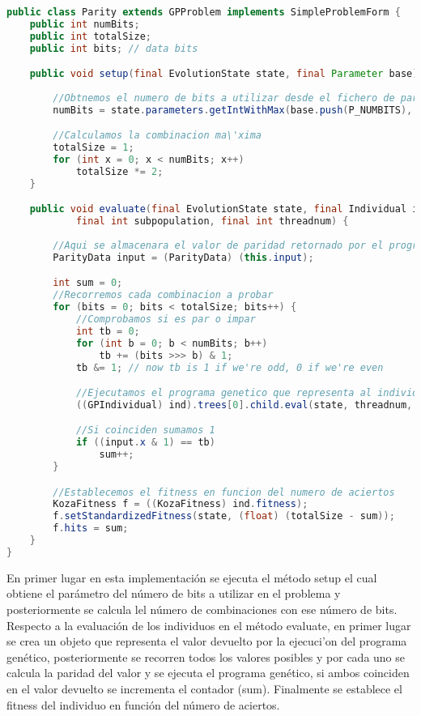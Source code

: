 \begin{lstlisting}[language=Java]
public class Parity extends GPProblem implements SimpleProblemForm {
	public int numBits;
	public int totalSize;
	public int bits; // data bits

	public void setup(final EvolutionState state, final Parameter base) {
		
		//Obtnemos el numero de bits a utilizar desde el fichero de parametros
		numBits = state.parameters.getIntWithMax(base.push(P_NUMBITS), null, 2, 31);

		//Calculamos la combinacion ma\'xima
		totalSize = 1;
		for (int x = 0; x < numBits; x++)
			totalSize *= 2;
	}

	public void evaluate(final EvolutionState state, final Individual ind,
			final int subpopulation, final int threadnum) {
		
		//Aqui se almacenara el valor de paridad retornado por el programa gen\'etico
		ParityData input = (ParityData) (this.input);

		int sum = 0;
		//Recorremos cada combinacion a probar
		for (bits = 0; bits < totalSize; bits++) {		
			//Comprobamos si es par o impar
			int tb = 0;
			for (int b = 0; b < numBits; b++)
				tb += (bits >>> b) & 1;
			tb &= 1; // now tb is 1 if we're odd, 0 if we're even

			//Ejecutamos el programa genetico que representa al individuo
			((GPIndividual) ind).trees[0].child.eval(state, threadnum, input, stack, ((GPIndividual) ind), this);

			//Si coinciden sumamos 1
			if ((input.x & 1) == tb)
				sum++;
		}

		//Establecemos el fitness en funcion del numero de aciertos
		KozaFitness f = ((KozaFitness) ind.fitness);
		f.setStandardizedFitness(state, (float) (totalSize - sum));
		f.hits = sum;
	}
}
\end{lstlisting}

En primer lugar en esta implementación se ejecuta el método setup el cual obtiene el parámetro del n\'umero de bits a utilizar en el problema y posteriormente se calcula lel n\'umero de combinaciones con ese n\'umero de bits. Respecto a la evaluación de los individuos en el método evaluate, en primer lugar se crea un objeto que representa el valor devuelto por la ejecuci'on del programa genético, posteriormente se recorren todos los valores posibles y por cada uno se calcula la paridad del valor y se ejecuta el programa gen\'etico, si ambos coinciden en el valor devuelto se incrementa el contador (sum). Finalmente se establece el fitness del individuo en funci\'on del n\'umero de aciertos.

